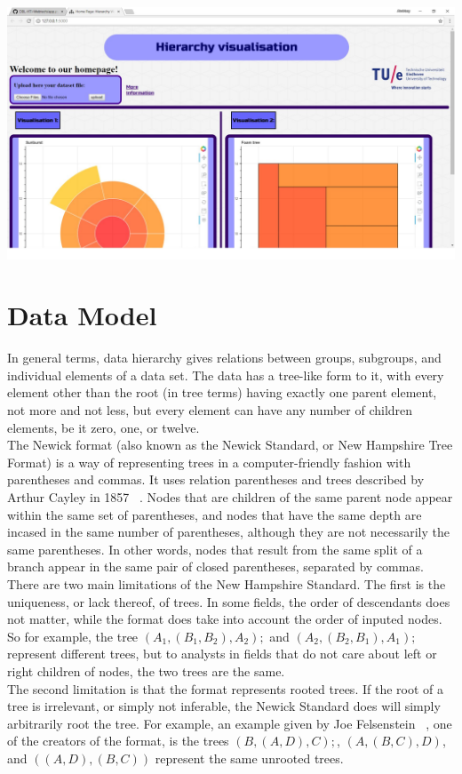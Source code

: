 \documentclass[journal, 9pt]{vgtc}                %
\begin{document}
\includegraphics[width=\linewidth]{vis2.png}

\section{Data Model}

In general terms, data hierarchy gives relations between groups, subgroups, and individual elements of a data set. The data has a tree-like form to it, with every element other than the root (in tree terms)
having exactly one parent element, not more and not less, but every element can have any number of children elements, be it zero, one, or twelve.\\
The Newick format (also known as the Newick Standard, or New Hampshire Tree Format) is a way of representing trees in a computer-friendly fashion with parentheses and commas. It uses relation parentheses and
trees described by Arthur Cayley in 1857 ~\cite{newick}. Nodes that are children of the same parent node appear within the same set of parentheses,
and nodes that have the same depth are incased in the same number of parentheses, although they are not necessarily the same parentheses. In other words, nodes that result from the
same split of a branch appear in the same pair of closed parentheses, separated by commas.\\
There are two main limitations of the New Hampshire Standard. The first is the uniqueness, or lack thereof, of trees. In some fields, the order of descendants does not matter, while the format does
take into account the order of inputed nodes. So for example, the tree $(A_1,(B_1,B_2),A_2);$ and $(A_2,(B_2,B_1),A_1);$ represent different trees, but to analysts in fields that do not care about left or right
children of nodes, the two trees are the same.\\
The second limitation is that the format represents rooted trees. If the root of a tree is irrelevant, or simply not inferable, the Newick Standard does will simply arbitrarily root the tree.
For example, an example given by Joe Felsenstein ~\cite{newick}, one of the creators of the format, is the trees $(B,(A,D),C);$, $(A,(B,C),D)$, and $((A,D),(B,C))$ represent the same unrooted trees.\\
\end{document}
